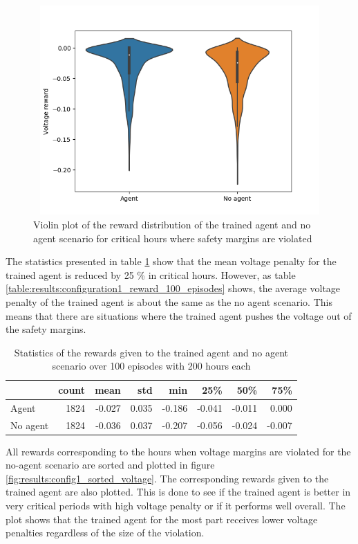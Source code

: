 \documentclass[class=book, crop=false]{standalone}
\begin{document}
\begin{figure}[H]
    \center
\includegraphics[height=8cm, width=12cm]{figures/config1_voltage_violin.png}
    \caption[size = 9]{Violin plot of the reward distribution of the trained agent and no agent scenario for critical hours where safety margins are violated}
    \label{fig:results:config1_voltage_violin}
\end{figure}

The statistics presented in table \ref{table:results:configuration1_reward_100_ep_preventive} show that the mean voltage penalty for the trained agent is reduced by 25 \% in critical hours. However, as table
\ref{table:results:configuration1_reward_100_episodes} shows, the average voltage penalty of the trained agent is about the same as the no agent scenario. This means that there are situations where the trained agent pushes the voltage out of the safety margins.    


\begin{table}[ht]
\center
\begin{tabular}{l|rrrrrrr}
         & count & mean   & std   & min    & 25\%   & 50\%   & 75\%   \\
\hline
Agent    & 1824 & -0.027 & 0.035 & -0.186 & -0.041 & -0.011 & 0.000  \\
No agent & 1824 & -0.036 & 0.037 & -0.207 & -0.056 & -0.024 & -0.007 \\
\hline
\end{tabular}
\caption{Statistics of the rewards given to the trained agent and no agent scenario over 100 episodes with 200 hours each}
\label{table:results:configuration1_reward_100_ep_preventive}
\end{table}



All rewards corresponding to the hours when voltage margins are violated for the no-agent scenario are sorted and plotted in figure \ref{fig:results:config1_sorted_voltage}. The corresponding rewards given to the trained agent are also plotted. This is done to see if the trained agent is better in very critical periods with high voltage penalty or if it performs well overall. The plot shows that the trained agent for the most part receives lower voltage penalties regardless of the size of the violation. 
\end{document}
